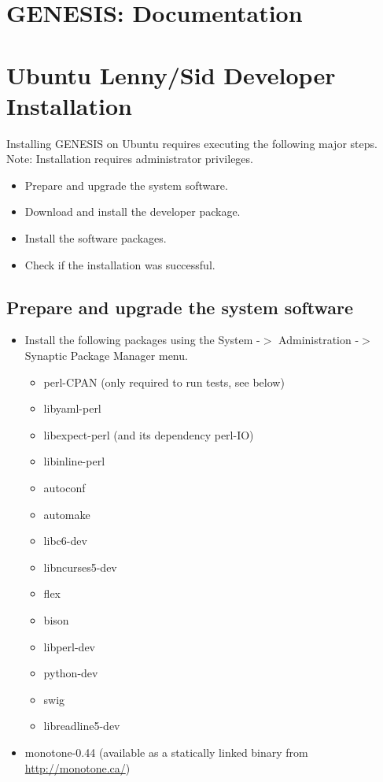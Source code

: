 \documentclass[12pt]{article}
\begin{document}
\section*{GENESIS: Documentation}

\section*{Ubuntu Lenny/Sid Developer Installation}

Installing GENESIS on Ubuntu requires executing the following major steps. Note: Installation requires administrator privileges.
\begin{itemize}
   \item[] Prepare and upgrade the system software.
   \item[] Download and install the developer package.
   \item[] Install the software packages.
   \item[] Check if the installation was successful. 
\end{itemize}

\subsection*{Prepare and upgrade the system software}

\begin{itemize}
   \item[] Install the following packages using the System -$>$ Administration -$>$ Synaptic Package Manager menu.
      \begin{itemize}
         \item perl-CPAN (only required to run tests, see below)
         \item libyaml-perl
         \item libexpect-perl (and its dependency perl-IO)
         \item libinline-perl
         \item autoconf
         \item automake
         \item libc6-dev
         \item libncurses5-dev
         \item flex
         \item bison
         \item libperl-dev
         \item python-dev
         \item swig
         \item libreadline5-dev 
      \end{itemize}
   \item[] monotone-0.44 (available as a statically linked binary from \href{http://monotone.ca/}{http://monotone.ca/}) 
 \end{itemize}
\end{document}
